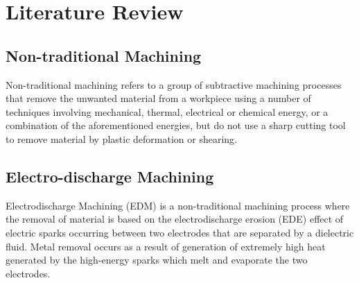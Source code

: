\section{Literature Review}
\lhead{\leftmark}
\label{sec:review}
%
\subsection{Non-traditional Machining}
Non-traditional machining refers to a group of subtractive machining processes that remove the unwanted material from a workpiece using a number of techniques involving mechanical, thermal, electrical or chemical energy, or a combination of the aforementioned energies, but do not use a sharp cutting tool to remove material by plastic deformation or shearing\cite{classnotes}.

\subsection{Electro-discharge Machining}
Electrodischarge Machining (EDM) is a non-traditional machining process where the removal of material is based on the electrodischarge erosion (EDE) effect of electric sparks occurring between two electrodes that are separated by a dielectric fluid. Metal removal occurs as a result of generation of extremely high heat generated by the high-energy sparks which melt and evaporate the two electrodes.
